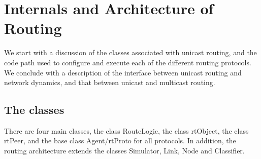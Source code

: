 \section{Internals and Architecture of Routing}
\label{sec:rtg-internals}

We start with a discussion of the classes associated with
unicast routing, and the code path used to configure and execute
each of the different routing protocols.
We conclude with a description of
the interface between unicast routing and network dynamics, and
that between unicast and multicast routing.

\subsection{The classes}
There are four main classes,
the class RouteLogic, the class rtObject, the class rtPeer, and the
base class Agent/rtProto for all protocols.
In addition, the routing architecture extends 
the classes Simulator, Link, Node and Classifier.

